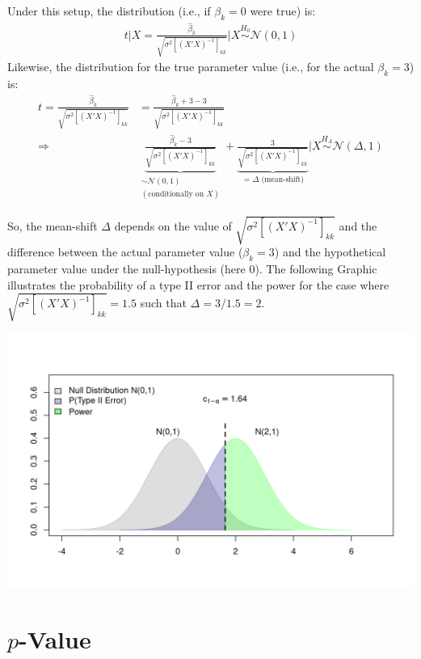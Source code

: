 \documentclass[
  14pt,
]{memoir}
\begin{document}
Under this setup, the distribution  (i.e., if \(\beta_k=0\) were true) is:
\begin{align*}
t\big|X=\frac{\hat\beta_k}{\sqrt{\sigma^2[(X'X)^{-1}]_{kk}}}\Big|X\overset{H_0}{\sim}\mathcal{N}(0,1)
\end{align*}
Likewise, the distribution  for the true parameter value (i.e., for the actual \(\beta_k=3\)) is:
\begin{align*}
t
=\frac{\hat\beta_k}{\sqrt{\sigma^2[(X'X)^{-1}]_{kk}}}
&=\frac{\hat\beta_k+3-3}{\sqrt{\sigma^2[(X'X)^{-1}]_{kk}}}\\[2ex]
\Rightarrow\quad&\underbrace{\frac{\hat\beta_k-3}{\sqrt{\sigma^2[(X'X)^{-1}]_{kk}}}}_{\substack{\sim \mathcal{N}(0,1)\\(\text{conditionally on $X$})}}+\underbrace{\frac{3}{\sqrt{\sigma^2[(X'X)^{-1}]_{kk}}}}_{=\Delta\text{ (mean-shift)}}\Big|X\overset{H_A}{\sim}\mathcal{N}(\Delta,1)
\end{align*}

So, the mean-shift \(\Delta\) depends on the value of \(\sqrt{\sigma^2[(X'X)^{-1}]_{kk}}\) and the difference between the actual parameter value (\(\beta_k=3\)) and the hypothetical parameter value under the null-hypothesis (here \(0\)). The following Graphic illustrates the probability of a type II error and the power for the case where \(\sqrt{\sigma^2[(X'X)^{-1}]_{kk}}=1.5\) such that \(\Delta=3/1.5=2\).

\begin{center}\includegraphics[width=1\textwidth]{figure/minimal-unnamed-chunk-70-1} \end{center}

\hypertarget{p-value}{%
\section{\texorpdfstring{\(p\)-Value}{p-Value}}\label{p-value}}
\end{document}
